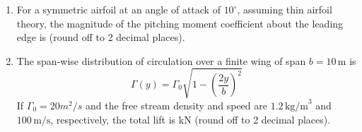 \documentclass[journal,12pt,onecolumn]{IEEEtran}
\theoremstyle{remark}
\begin{document}
\begin{enumerate}
    
    \item For a symmetric airfoil at an angle of attack of $10^\circ$, assuming thin airfoil theory, the magnitude of the pitching moment coefficient about the leading edge is {\underline{\hspace{1cm}}}(round off to 2 decimal places).
    

    \item The span-wise distribution of circulation over a finite wing of span $b = 10 \, \text{m}$ is 
    \[
    \Gamma(y) = \Gamma_0 \sqrt{1 - (\frac{2y}{b})^2}
    \]
    If $\Gamma_0 = 20m^2/s$ and the free stream density and speed are $1.2 \, \text{kg/m}^3$ and $100 \, \text{m/s}$, respectively, the total lift is {\underline{\hspace{1cm}}} kN (round off to 2 decimal places).
   










\end{enumerate}
\end{document}
